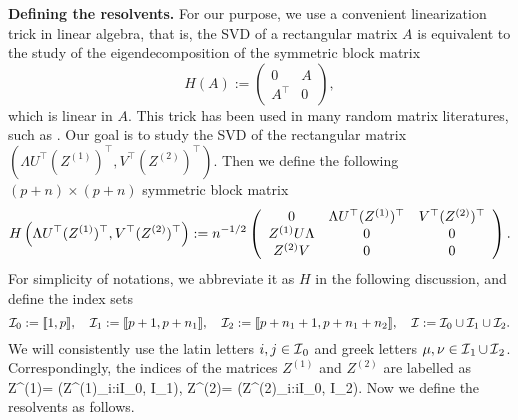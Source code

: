 \medskip
\noindent\textbf{Defining the resolvents.} For our purpose, we use a convenient linearization trick in linear algebra, that is, the SVD of a rectangular matrix $A$ is equivalent to the study of the eigendecomposition of the symmetric block matrix 
$$H(A):=\begin{pmatrix}0 & A \\ A^\top & 0\end{pmatrix},$$
which is linear in $A$. This trick has been used in many random matrix literatures, such as \cite{Anisotropic, AEK_Gram, XYY_circular,DY20201}. Our goal is to study the SVD of the rectangular matrix $(\Lambda U^\top (Z^{(1)})^\top,V^\top (Z^{(2)})^\top)$. %
Then we define the following $(p+n)\times (p+n)$ symmetric block matrix 
 \begin{equation}\label{linearize_block}
    H\left(\Lambda U^\top (Z^{(1)})^\top,V^\top (Z^{(2)})^\top\right): = n^{-1/2}\left( {\begin{array}{*{20}c}
   { 0 } & \Lambda U^{\top}(Z^{(1)})^\top & V^\top (Z^{(2)})^\top  \\
   {Z^{(1)} U\Lambda  } & {0} & 0 \\
   {Z^{(2)}V} & 0 & 0
   \end{array}} \right).
 \end{equation}
For simplicity of notations, we abbreviate it as $H$ in the following discussion, and define the index sets
$$\cal I_0:=\llbracket 1,p\rrbracket, \quad  \cal I_1:=\llbracket p+1,p+n_1\rrbracket, \quad \cal I_2:=\llbracket p+n_1+1,p+n_1+n_2\rrbracket ,\quad \cal I:=\cal I_0\cup \cal I_1\cup \cal I_2  .$$
 We will consistently use the latin letters $i,j\in\sI_{0}$ and greek letters $\mu,\nu\in\sI_{1}\cup \sI_{2}$. Correspondingly, the indices of the matrices $Z^{(1)}$ and $Z^{(2)}$ are labelled as
 \be\label{labelZ}
 Z^{(1)}= (Z^{(1)}_{\mu i}:i\in \mathcal I_0, \mu \in \mathcal I_1), \quad Z^{(2)}= (Z^{(2)}_{\nu i}:i\in \mathcal I_0, \nu \in \mathcal I_2).\ee
Now we define the resolvents as follows.
